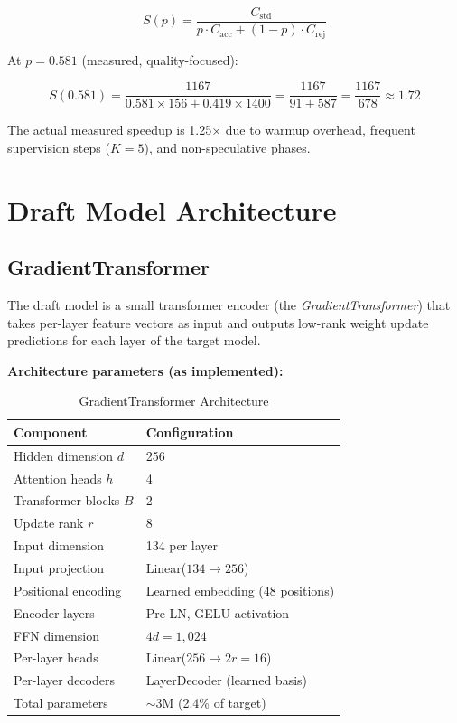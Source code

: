 \documentclass[conference]{IEEEtran}
\begin{document}
\begin{equation}
S(p) = \frac{C_{\mathrm{std}}}{p \cdot C_{\mathrm{acc}} + (1 - p) \cdot C_{\mathrm{rej}}}
\label{eq:speedup}
\end{equation}

At $p = 0.581$ (measured, quality-focused):

\begin{equation}
S(0.581) = \frac{1167}{0.581 \times 156 + 0.419 \times 1400} = \frac{1167}{91 + 587} = \frac{1167}{678} \approx 1.72
\end{equation}

The actual measured speedup is 1.25$\times$ due to warmup overhead, frequent supervision steps ($K{=}5$), and non-speculative phases.

\section{Draft Model Architecture}

\subsection{GradientTransformer}

The draft model is a small transformer encoder (the \emph{GradientTransformer}) that takes per-layer feature vectors as input and outputs low-rank weight update predictions for each layer of the target model.

\noindent\textbf{Architecture parameters (as implemented):}

\begin{table}[h]
\centering
\caption{GradientTransformer Architecture}
\label{tab:draft_arch}
\begin{tabular}{@{}ll@{}}
\toprule
\textbf{Component} & \textbf{Configuration} \\
\midrule
Hidden dimension $d$ & 256 \\
Attention heads $h$ & 4 \\
Transformer blocks $B$ & 2 \\
Update rank $r$ & 8 \\
Input dimension & 134 per layer \\
Input projection & Linear($134 \rightarrow 256$) \\
Positional encoding & Learned embedding (48 positions) \\
Encoder layers & Pre-LN, GELU activation \\
FFN dimension & $4d = 1{,}024$ \\
Per-layer heads & Linear($256 \rightarrow 2r = 16$) \\
Per-layer decoders & LayerDecoder (learned basis) \\
Total parameters & $\sim$3M (2.4\% of target) \\
\bottomrule
\end{tabular}
\end{table}
\end{document}
